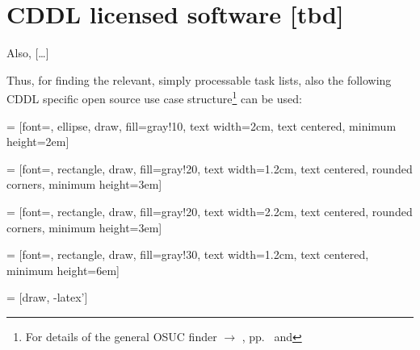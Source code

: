 %
%
%
%
%



\section{CDDL licensed software [tbd]}

Also, [\ldots]

Thus, for
finding the relevant, simply processable task lists, also the following CDDL
specific open source use case structure\footnote{For details of the general OSUC
finder $\rightarrow$ \oslic, pp.\ \pageref{OsucTokens} and
\pageref{OsucDefinitionTree}} can be used:
 
 = [font=\small, ellipse, draw, fill=gray!10, 
    text width=2cm, text centered, minimum height=2em]

 = [font=\footnotesize, rectangle, draw, fill=gray!20, 
    text width=1.2cm, text centered, rounded corners, minimum height=3em]

 = [font=\footnotesize, rectangle, draw, fill=gray!20, 
    text width=2.2cm, text centered, rounded corners, minimum height=3em]
    
 = [font=\tiny, rectangle, draw, fill=gray!30, 
    text width=1.2cm, text centered, minimum height=6em]

 = [draw, -latex']

